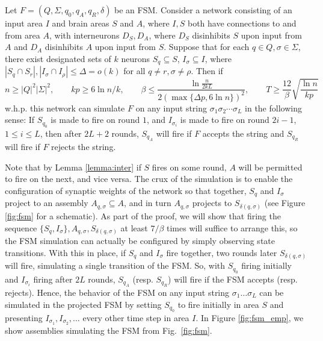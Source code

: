 \documentclass[12pt,nosubfloats]{alt2024} %
\newcommand{\1}{\mathbbm{1}}
\begin{document}
\begin{theorem} \label{thm:fsm}
Let $F = (Q, \Sigma, q_0, q_A, q_R, \delta)$ be an FSM. Consider a network consisting of an input area $I$ and brain areas $S$ and $A$, where $I, S$ both have connections to and from area $A$, with interneurons $D_S, D_A$, where $D_S$ disinhibits $S$ upon input from $A$ and $D_A$ disinhibits $A$ upon input from $S$. Suppose that for each $q \in Q, \sigma \in \Sigma$, there exist designated sets of $k$ neurons $S_q \subseteq S$, $I_\sigma \subseteq I$, where $|S_q \cap S_r|, |I_\sigma \cap I_\rho| \le \Delta = o(k)$ for all $q \neq r, \sigma \neq \rho$. Then if 
\[n \ge |Q|^2|\Sigma|^2, \qquad kp \ge 6 \ln n / k, \qquad \beta \le \frac{ \ln \frac{n}{2kL}}{2 (\max \{\Delta p, 6 \ln n\})^2 }, \qquad T \ge \frac{12}{\beta} \sqrt{\frac{\ln n}{kp}} \] w.h.p. this network can simulate $F$ on any input string $\sigma_1 \sigma_2 \cdots \sigma_L$ in the following sense: If $S_{q_0}$ is made to fire on round $1$, and $I_{\sigma_i}$ is made to fire on round $2i - 1$, $1\le i \le L$, then after $2L+2$ rounds, $S_{q_A}$ will fire if $F$ accepts the string and $S_{q_R}$ will fire if $F$ rejects the string.
\end{theorem}

Note that by Lemma \ref{lemma:inter} if $S$ fires on some round, $A$ will be permitted to fire on the next, and vice versa. The crux of the simulation is to enable the configuration of synaptic weights of the network so that together, $S_q$ and $I_\sigma$ project to an assembly $A_{q, \sigma} \subseteq A$, and in turn $A_{q, \sigma}$ projects to $S_{\delta(q, \sigma)}$ (see Figure \ref{fig:fsm} for a schematic). As part of the proof, we will show that firing the sequence $\{S_q, I_\sigma\}, A_{q, \sigma}, S_{\delta(q, \sigma)}$ at least $7 / \beta$ times will suffice to arrange this, so the FSM simulation can actually be configured by simply observing state transitions. With this in place, if $S_q$ and $I_\sigma$ fire together, two rounds later $S_{\delta(q, \sigma)}$ will fire, simulating a single transition of the FSM. So, with $S_{q_0}$ firing initially and $I_{\sigma_i}$ firing after $2L$ rounds, $S_{q_A}$ (resp. $S_{q_R}$) will fire if the FSM accepts (resp. rejects). Hence, the behavior of the FSM on any input string $\sigma_1 \ldots \sigma_L$ can be simulated in the projected FSM by setting $S_{q_0}$ to fire initially in area $S$ and presenting $I_{\sigma_1}, I_{\sigma_2}, \ldots$ every other time step in area $I$.  In Figure \ref{fig:fsm_emp}, we show assemblies simulating the FSM from Fig.~\ref{fig:fsm}.
\end{document}

